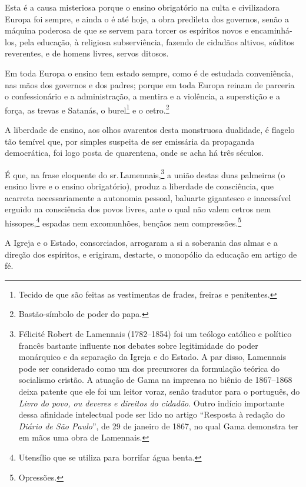 Esta é a causa misteriosa porque o ensino obrigatório na culta e
civilizadora Europa foi sempre, e ainda o é até hoje, a obra predileta
dos governos, senão a máquina poderosa de que se servem para torcer os
espíritos novos e encaminhá-los, pela educação, à religiosa
subserviência, fazendo de cidadãos altivos, súditos reverentes, e de
homens livres, servos ditosos.

Em toda Europa o ensino tem estado sempre, como é de estudada
conveniência, nas mãos dos governos e dos padres; porque em toda Europa
reinam de parceria o confessionário e a administração, a mentira e a
violência, a superstição e a força, as trevas e Satanás, o
burel\footnote{Tecido de que são feitas as vestimentas de frades,
  freiras e penitentes.} e o cetro.\footnote{Bastão-símbolo de poder do
  papa.}

A liberdade de ensino, aos olhos avarentos desta monstruosa dualidade, é
flagelo tão temível que, por simples suspeita de ser emissária da
propaganda democrática, foi logo posta de quarentena, onde se acha há
três séculos.

É que, na frase eloquente do sr.\,Lamennais,\footnote{Félicité Robert de
  Lamennais (1782--1854) foi um teólogo católico e político francês
  bastante influente nos debates sobre legitimidade do poder monárquico
  e da separação da Igreja e do Estado. A par disso, Lamennais pode ser
  considerado como um dos precursores da formulação teórica do
  socialismo cristão. A atuação de Gama na imprensa no biênio de
  1867--1868 deixa patente que ele foi um leitor voraz, senão tradutor
  para o português, do \emph{Livro do povo, ou deveres e direitos do
  cidadão}. Outro indício importante dessa afinidade intelectual pode
  ser lido no artigo ``Resposta à redação do \textit{Diário de São Paulo}'', de
  29 de janeiro de 1867, no qual Gama demonstra ter em mãos uma obra de Lamennais.
  }
a união destas duas palmeiras (o ensino livre e o ensino obrigatório),
produz a liberdade de consciência, que acarreta necessariamente a
autonomia pessoal, baluarte gigantesco e inacessível erguido na
consciência dos povos livres, ante o qual não valem cetros nem
hissopes,\footnote{Utensílio que se utiliza para borrifar água benta.}
espadas nem excomunhões, bençãos nem compressões.\footnote{Opressões.}

A Igreja e o Estado, consorciados, arrogaram a si a soberania das almas
e a direção dos espíritos, e erigiram, destarte, o monopólio da educação
em artigo de fé.

